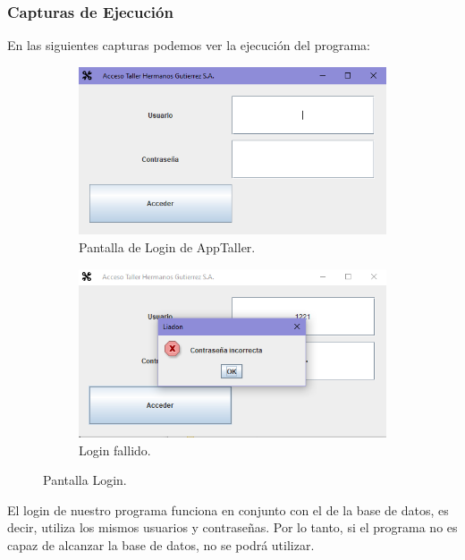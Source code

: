 \documentclass{article}
\begin{document}
  \subsubsection{Capturas de Ejecución}
  En las siguientes capturas podemos ver la ejecución del programa:\\
  \begin{figure}[H]
    \centering
    \begin{subfigure}{.5\textwidth}
      \centering
      \includegraphics[width=0.9\linewidth]{program/capturasEjec/login.PNG}
      \caption{Pantalla de Login de AppTaller.}
    \end{subfigure}%
    \begin{subfigure}{.5\textwidth}
      \centering
      \includegraphics[width=0.9\linewidth]{program/capturasEjec/loginFallido.PNG}
      \caption{Login fallido.}
    \end{subfigure}
    \caption{Pantalla Login.}
  \end{figure}
  El login de nuestro programa funciona en conjunto con el de la base de datos, es decir, utiliza los mismos usuarios y contraseñas. Por lo tanto, si el programa no es capaz de alcanzar la base de datos,
  no se podrá utilizar.\\
\end{document}
